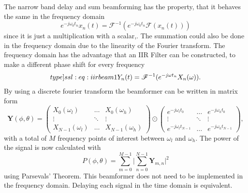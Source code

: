 The narrow band delay and sum beamforming has the property, that it behaves
the same in the frequency domain
\begin{equation}
	e^{-j\omega_0 t_n} x_n(t) = \mathscr{F}^{-1}(e^{-j\omega_0 t_n} \mathscr{F}(x_n(t)))
\end{equation}
since it is just a multiplication with a scalar,. 
The summation could also be done in the frequency domain due to the 
linearity of the Fourier transform.
The frequency domain has the advantage that an IIR Filter can be constructed, to 
make a different phase shift for every frequency 
\begin{equation}
	\label[type]{ssl:eq:iirbeam1}
	Y_n(t) = \mathscr{F}^{-1}(e^{-j\omega t_n} X_n(\omega)).
\end{equation}
By using a discrete fourier transform the beamformer can be written
in matrix form
\begin{equation}
	\bm{Y}(\phi, \theta) = 
	\begin{pmatrix}
		X_0(\omega_l) & \hdots & X_0(\omega_h)\\
		\vdots & \ddots & \vdots \\
		X_{N-1}(\omega_l) & \hdots & X_{N-1}(\omega_h)
	\end{pmatrix}
	\odot
	\begin{pmatrix}
		e^{-j\omega_l t_0} & \hdots & e^{-j\omega_h t_0}\\
		\vdots & \ddots & \vdots \\
		e^{-j\omega_l t_{N-1}} & \hdots & e^{-j\omega_h t_{N-1}}
	\end{pmatrix},
\end{equation}
with a total of $M$ frequency points of interest between $\omega_l$ and $\omega_h$.
The power of the signal is now calculated with
\begin{equation}
	P(\phi, \theta) =  \sum_{m=0}^{M-1}\lvert \sum_{n=0}^{N-1} \bm{Y}_{m, n} \rvert^2
\end{equation}
using Parsevals' Theorem.
This beamformer does not need to be implemented in the frequency domain.
Delaying each signal in the time domain is equivalent.

